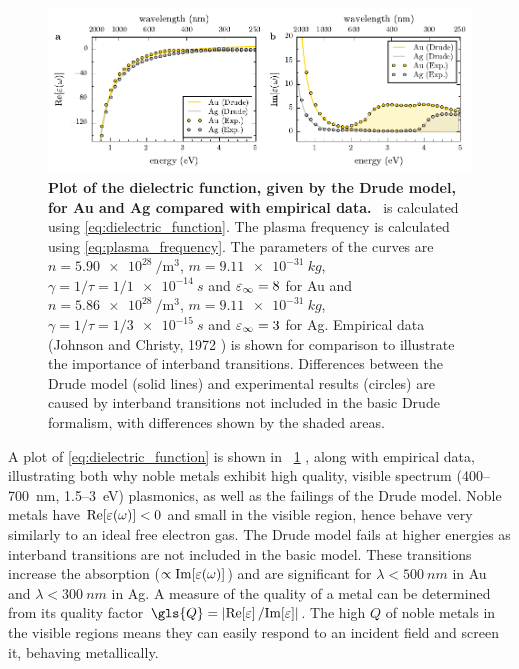 \documentclass{article}
\begin{document}
\begin{figure}[bt]
\centering
\includegraphics{figures/dielectric_function}
\caption[Plot of the dielectric function, given by the Drude model, for Au and Ag compared with empirical data]{\textbf{Plot of the dielectric function, given by the Drude model, for Au and Ag compared with empirical data.} \dielectric\ is calculated using \eqref{eq:dielectric_function}. The plasma frequency is calculated using \eqref{eq:plasma_frequency}. The parameters of the curves are $n=\SI{5.90e28}{\per\metre\cubed}$, $m=\SI{9.11e-31}{kg}$, $\gamma=1/\tau=1/\SI{1e-14}{s}$ and $\varepsilon_\infty = 8$ for Au and $n=\SI{5.86e28}{\per\metre\cubed}$, $m=\SI{9.11e-31}{kg}$, $\gamma=1/\tau=1/\SI{3e-15}{s}$ and $\varepsilon_\infty = 3$ for Ag. Empirical data (Johnson and Christy, 1972 \cite{johnson1972optical}) is shown for comparison to illustrate the importance of interband transitions. Differences between the Drude model (solid lines) and experimental results (circles) are caused by interband transitions not included in the basic Drude formalism, with differences shown by the shaded areas.}
\label{fig:dielectric_function}
\end{figure}

A plot of \eqref{eq:dielectric_function} is shown in \figurename~\ref{fig:dielectric_function} , along with empirical data, illustrating both why noble metals exhibit high quality, visible spectrum (400--\SI{700}{nm}, 1.5--\SI{3}{eV}) plasmonics, as well as the failings of the Drude model. Noble metals have $\mathrm{Re}\!\left[{\varepsilon(\omega)}\right]<0$ and small \imag{\dielectric} in the visible region, hence behave very similarly to an ideal free electron gas. The Drude model fails at higher energies as interband transitions are not included in the basic model. These transitions increase the absorption ($\propto\mathrm{Im}\!\left[{\varepsilon(\omega)}\right]$) and are significant for $\lambda < \SI{500}{nm}$ in Au and $\lambda<\SI{300}{nm}$ in Ag. A measure of the quality of a metal can be determined from its quality factor $\gls{Q} = \left|\real{\eps}/\imag{\eps}\right|$. The high $Q$ of noble metals in the visible regions means they can easily respond to an incident field and screen it, behaving metallically.
\end{document}
